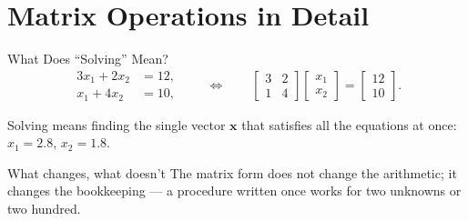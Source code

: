 \documentclass[9pt,aspectratio=169,xcolor=table]{beamer}
\begin{document}
\section{Matrix Operations in Detail}

\begin{frame}{What Does ``Solving'' Mean?}
    \leavevmode
    \[
    \begin{aligned}
    3x_1 + 2x_2 &= 12, \\
    x_1 + 4x_2 &= 10,
    \end{aligned}
    \qquad\Longleftrightarrow\qquad
    \begin{bmatrix} 3 & 2 \\ 1 & 4 \end{bmatrix}
    \begin{bmatrix} x_1 \\ x_2 \end{bmatrix}
    =
    \begin{bmatrix} 12 \\ 10 \end{bmatrix}.
    \]

    \vspace{2mm}
    Solving means finding the single vector $\mathbf{x}$ that satisfies
    \alert{all} the equations at once: $x_1 = 2.8$, $x_2 = 1.8$.

    \vspace{2mm}
    \begin{block}{What changes, what doesn't}
        The matrix form does not change the arithmetic; it changes the
        \alert{bookkeeping} --- a procedure written once works for two
        unknowns or two hundred.
    \end{block}
\end{frame}
\end{document}
